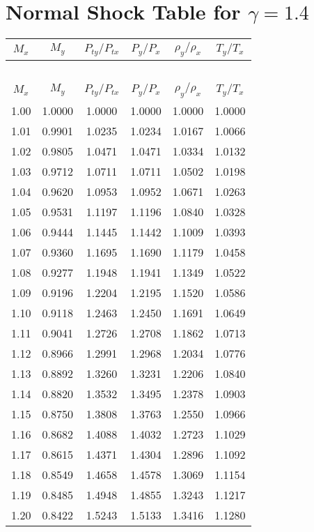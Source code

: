 \documentclass{article}
\begin{document}
\section*{Normal Shock Table for $\gamma = 1.4$}
\begin{longtable}{cccccc}  %

\toprule
$M_x$ & $M_y$ & $P_{ty}/P_{tx}$ & $P_y/P_x$ & $\rho_y/\rho_x$ & $T_y/T_x$ \\
\midrule
\endfirsthead
\multicolumn{6}{c}{~} \\
\toprule
$M_x$ & $M_y$ & $P_{ty}/P_{tx}$ & $P_y/P_x$ & $\rho_y/\rho_x$ & $T_y/T_x$ \\
\midrule
\endhead
1.00 & 1.0000 & 1.0000 & 1.0000 & 1.0000 & 1.0000 \\
1.01 & 0.9901 & 1.0235 & 1.0234 & 1.0167 & 1.0066 \\
1.02 & 0.9805 & 1.0471 & 1.0471 & 1.0334 & 1.0132 \\
1.03 & 0.9712 & 1.0711 & 1.0711 & 1.0502 & 1.0198 \\
1.04 & 0.9620 & 1.0953 & 1.0952 & 1.0671 & 1.0263 \\
1.05 & 0.9531 & 1.1197 & 1.1196 & 1.0840 & 1.0328 \\
1.06 & 0.9444 & 1.1445 & 1.1442 & 1.1009 & 1.0393 \\
1.07 & 0.9360 & 1.1695 & 1.1690 & 1.1179 & 1.0458 \\
1.08 & 0.9277 & 1.1948 & 1.1941 & 1.1349 & 1.0522 \\
1.09 & 0.9196 & 1.2204 & 1.2195 & 1.1520 & 1.0586 \\
1.10 & 0.9118 & 1.2463 & 1.2450 & 1.1691 & 1.0649 \\
1.11 & 0.9041 & 1.2726 & 1.2708 & 1.1862 & 1.0713 \\
1.12 & 0.8966 & 1.2991 & 1.2968 & 1.2034 & 1.0776 \\
1.13 & 0.8892 & 1.3260 & 1.3231 & 1.2206 & 1.0840 \\
1.14 & 0.8820 & 1.3532 & 1.3495 & 1.2378 & 1.0903 \\
1.15 & 0.8750 & 1.3808 & 1.3763 & 1.2550 & 1.0966 \\
1.16 & 0.8682 & 1.4088 & 1.4032 & 1.2723 & 1.1029 \\
1.17 & 0.8615 & 1.4371 & 1.4304 & 1.2896 & 1.1092 \\
1.18 & 0.8549 & 1.4658 & 1.4578 & 1.3069 & 1.1154 \\
1.19 & 0.8485 & 1.4948 & 1.4855 & 1.3243 & 1.1217 \\
1.20 & 0.8422 & 1.5243 & 1.5133 & 1.3416 & 1.1280 \\

\end{longtable}
\end{document}
